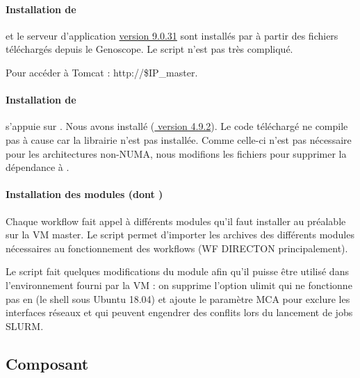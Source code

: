 \paragraph*{Installation de }

 et le serveur d'application \href{http://mirrors.ircam.fr/pub/apache/tomcat/tomcat-9/v9.0.31/bin/apache-tomcat-9.0.31.tar.gz}{ version 9.0.31}
sont installés par  à partir des fichiers téléchargés depuis le Genoscope.
Le script n'est pas très compliqué.

Pour accéder à Tomcat : http://\$IP\_master.

\paragraph*{Installation de }

 s'appuie sur .
Nous avons installé (\href{https://github.com/pegasus-isi/pegasus/archive/4.9.2.zip}{ version 4.9.2}).
Le code téléchargé ne compile pas à cause car la librairie  n'est pas installée.
Comme celle-ci n'est pas nécessaire pour les architectures non-NUMA, nous modifions les fichiers 
pour supprimer la dépendance à .

\paragraph*{Installation des modules (dont )}

Chaque workflow fait appel à différents modules qu'il faut installer au préalable sur la VM master.
Le script  permet d'importer les archives des différents modules nécessaires au fonctionnement des workflows (WF DIRECTON principalement).

Le script  fait quelques modifications du module  afin qu'il puisse être utilisé dans l'environnement fourni par la VM :
on supprime l'option ulimit qui ne fonctionne pas en  (le shell sous Ubuntu 18.04)
et ajoute le paramètre MCA  pour exclure les interfaces réseaux  et  qui peuvent engendrer des conflits lors du lancement de jobs SLURM.


\subsection{Composant } \label{nfsserver}

